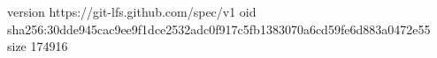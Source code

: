 version https://git-lfs.github.com/spec/v1
oid sha256:30dde945cac9ee9f1dce2532adc0f917c5fb1383070a6cd59fe6d883a0472e55
size 174916
